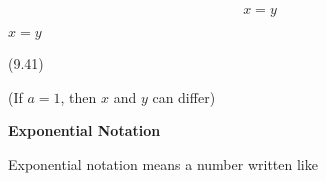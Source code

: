 \begin{description}
\begin{description}
{\begin{equation}
    x=y\tag{9.41}
      \end{equation}
    }{%
    \setlength{\mymathboxwidth}{\columnwidth}
      \addtolength{\mymathboxwidth}{-48pt}
    \par\vspace{12pt}\noindent\begin{minipage}{\columnwidth}
    \parbox[t]{\mymathboxwidth}{\large$
    x=y$}\hfill
    \parbox[t]{48pt}{\raggedleft 
    (9.41)}
    \end{minipage}\vspace{12pt}\par
    }%
        (If $a=1$, then $x$ and $y$ can differ)
        \\\end{description}
	    \item[] \noindent\raggedright {\bf  Exponential Notation }\\\begin{description}\item{\hspace{.3cm}}\hspace{.3cm}
      \label{m38359*id62672}Exponential notation means a number written like\par 
      \label{m38359*id62677}\nopagebreak\noindent{}

\end{description}
\end{description}
